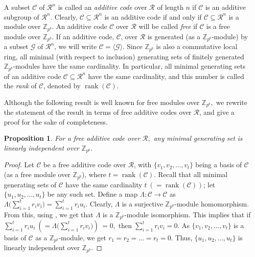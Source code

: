 \documentclass{article}
\DeclareMathOperator{\rank}{rank}
\newtheorem{prop}{Proposition}[section]
\theoremstyle{remark}
\theoremstyle{definition}
\numberwithin{equation}{section}
\begin{document}
A subset $\mathcal{C}$ of $\mathcal{R}^{n}$ is called an \emph{additive code} over $\mathcal{R}$ of length $n$ if $\mathcal{C}$ is an additive subgroup of $\mathcal{R}^{n}.$ Clearly, $\mathcal{C} \subseteq \mathcal{R}^{n}$ is an additive code if and only if $\mathcal{C} \subseteq \mathcal{R}^{n}$ is a module over $\mathbb{Z}_{p^b}.$ An additive code $\mathcal{C}$ over $\mathcal{R}$ will be called \emph{free} if $\mathcal{C}$ is a free module over $\mathbb{Z}_{p^b}$. If an additive code, $\mathcal{C}$, over $\mathcal{R}$ is generated (as a $\mathbb{Z}_{p^b}$-module) by a subset $\mathcal{G}$ of $\mathcal{R}^n$, we will write $\mathcal{C}=\langle \mathcal G \rangle$. Since $\mathbb{Z}_{p^b}$ is also a commutative local ring, all minimal (with respect to inclusion) generating sets of finitely generated $\mathbb{Z}_{p^b}$-modules have the same cardinality. In particular, all minimal generating sets of an additive code $\mathcal{C} \subseteq \mathcal{R}^{n}$ have the same cardinality, and this number is called the \emph{rank} of $\mathcal{C}$, denoted by $\rank(\mathcal{C}).$ 

Although the following result is well known for free modules over $\mathbb{Z}_{p^b},$ we rewrite the statement of the result in terms of free additive codes over $\mathcal{R}$, and give a proof for the sake of completeness.
\begin{prop}\label{prop:free} For a free additive code over $\mathcal{R},$ any minimal generating set is linearly independent over $\mathbb{Z}_{p^b}.$ 
\end{prop}
\begin{proof} Let $\mathcal{C}$ be a free additive code over $\mathcal{R}$, with $\{v_1,v_2,\ldots,v_t\}$ being a basis of $\mathcal{C}$ (as a free module over $\mathbb{Z}_{p^b}$), where $t=\rank(\mathcal{C})$. Recall that all minimal generating sets of $\mathcal{C}$ have the same cardinality $t ~(=\rank(\mathcal{C}))$; let $\{u_1,u_2,\ldots,u_t\}$ be any such set. Define a map $\Lambda: \mathcal{C} \to \mathcal{C}$ as $\Lambda\biggl(\sum\limits_{i=1 }^{t} r_i v_i\biggr)=\sum\limits_{i=1 }^{t} r_i u_i.$ Clearly, $\Lambda$ is a surjective $\mathbb{Z}_{p^b}$-module homomorphism. From this, using \cite[Proposition 1.2]{vasconcelos},  we get that $\Lambda$ is a $\mathbb{Z}_{p^b}$-module isomorphism. This implies that if $\sum\limits_{i=1 }^{t} r_i u_i ~(=\Lambda\biggl(\sum\limits_{i=1 }^{t} r_i v_i\biggr))~=0,$ then $\sum\limits_{i=1 }^{t} r_i v_i=0.$ As $\{v_1,v_2,\ldots,v_t\}$ is a basis of $\mathcal{C}$ as a $\mathbb{Z}_{p^b}$-module, we get $r_1=r_2=\ldots=r_t=0.$ Thus, $\{u_1,u_2,\ldots,u_t\}$ is linearly independent over $\mathbb{Z}_{p^b}$.
\end{proof}
\end{document}
